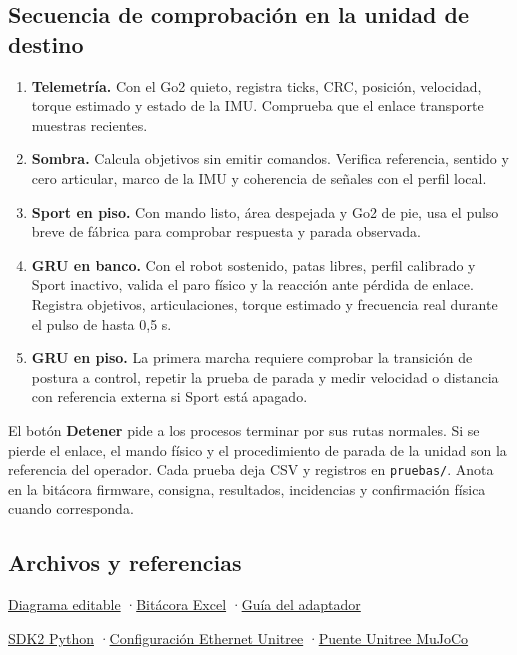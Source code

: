 \documentclass[11pt,a4paper]{article}
\begin{document}
\subsection*{Secuencia de comprobación en la unidad de destino}
\begin{enumerate}
\item \textbf{Telemetría.} Con el Go2 quieto, registra ticks, CRC, posición, velocidad, torque estimado y estado de la IMU. Comprueba que el enlace transporte muestras recientes.
\item \textbf{Sombra.} Calcula objetivos sin emitir comandos. Verifica referencia, sentido y cero articular, marco de la IMU y coherencia de señales con el perfil local.
\item \textbf{Sport en piso.} Con mando listo, área despejada y Go2 de pie, usa el pulso breve de fábrica para comprobar respuesta y parada observada.
\item \textbf{GRU en banco.} Con el robot sostenido, patas libres, perfil calibrado y Sport inactivo, valida el paro físico y la reacción ante pérdida de enlace. Registra objetivos, articulaciones, torque estimado y frecuencia real durante el pulso de hasta 0,5 s.
\item \textbf{GRU en piso.} La primera marcha requiere comprobar la transición de postura a control, repetir la prueba de parada y medir velocidad o distancia con referencia externa si Sport está apagado.
\end{enumerate}

El botón \textbf{Detener} pide a los procesos terminar por sus rutas normales. Si se pierde el enlace, el mando físico y el procedimiento de parada de la unidad son la referencia del operador. Cada prueba deja CSV y registros en \texttt{pruebas/}. Anota en la bitácora firmware, consigna, resultados, incidencias y confirmación física cuando corresponda.

\subsection*{Archivos y referencias}
\href{https://github.com/daca2022/go2-rl-deploy/blob/main/docs/Go2-Entrega.drawio}{Diagrama editable}
\quad·\quad\href{https://github.com/daca2022/go2-rl-deploy/blob/main/docs/Bitacora-Go2.xlsx}{Bitácora Excel}
\quad·\quad\href{https://github.com/daca2022/go2-rl-deploy/blob/main/docs/Adaptador-A2-Go2.md}{Guía del adaptador}

\href{https://github.com/unitreerobotics/unitree_sdk2_python}{SDK2 Python}
\quad·\quad\href{https://github.com/unitreerobotics/unitree_ros2}{Configuración Ethernet Unitree}
\quad·\quad\href{https://github.com/unitreerobotics/unitree_mujoco}{Puente Unitree MuJoCo}
\end{document}
